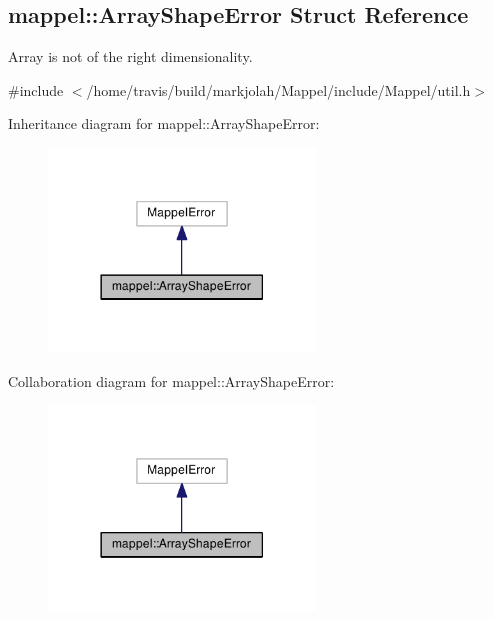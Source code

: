 \hypertarget{structmappel_1_1ArrayShapeError}{}\subsection{mappel\+:\+:Array\+Shape\+Error Struct Reference}
\label{structmappel_1_1ArrayShapeError}


Array is not of the right dimensionality.  




{\ttfamily \#include $<$/home/travis/build/markjolah/\+Mappel/include/\+Mappel/util.\+h$>$}



Inheritance diagram for mappel\+:\+:Array\+Shape\+Error\+:\nopagebreak
\begin{figure}[H]
\begin{center}
\leavevmode
\includegraphics[width=201pt]{structmappel_1_1ArrayShapeError__inherit__graph}
\end{center}
\end{figure}


Collaboration diagram for mappel\+:\+:Array\+Shape\+Error\+:\nopagebreak
\begin{figure}[H]
\begin{center}
\leavevmode
\includegraphics[width=201pt]{structmappel_1_1ArrayShapeError__coll__graph}
\end{center}
\end{figure}
